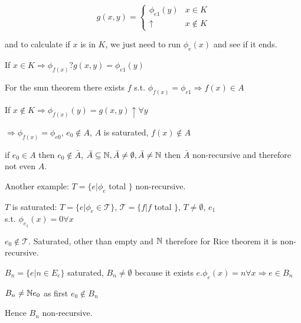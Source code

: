 \begin{equation*} g(x,y) = \begin{cases} \phi_{e1}(y) & x \in K \\
\uparrow & x \not\in K
  \end{cases}
\end{equation*}

and to calculate if $x$ is in $K$, we just need to run $ \phi_e(x) $
and see if it ends.

If $ x\in K \Rightarrow \phi_{f(x)} ? g(x,y) = \phi_{e1}(y)$

For the smn theorem there exists $f$ s.t. $ \phi_{f(x)} = \phi_{e1}
\Rightarrow f(x)\in A$

If $ x \not\in K \Rightarrow \phi_{f(x)}(y) = g(x,y) \uparrow \forall
y $

$ \Rightarrow \phi_{f(x)} = \phi_{e0} $, $ e_0 \not\in A $, $A$ is
saturated, $ f(x)\not\in A $

if $ e_0 \in A $ then $ e_0 \not \in \bar{A} $, $ \bar{A} \subseteq
\mathbb{N}, \bar{A} \not= \emptyset, \bar{A}\not=\mathbb{N} $ then $ \bar{A} $
non-recursive and therefore not even $A$.


Another example: $ T = \{e | \phi_e $ total $ \} $ non-recursive.

$T$ is saturated: $ T = \{e | \phi_e \in \mathcal{T} \} $, $
\mathcal{T} = \{f | f $ total $ \} $, $ T\not=\emptyset $, $ e_1 $\\
s.t. $ \phi_{e_1}(x) = 0 \forall x $

$ e_0 \not\in \mathcal{T} $. Saturated, other than empty and $ \mathbb{N} $
therefore for Rice theorem it is non-recursive.

$ B_n = \{e | n \in E_e \} $ saturated, $ B_n \not= \emptyset $
because it exists $ e. \phi_e(x) = n \forall x \Rightarrow e \in B_n $

$ B_n \not= \mathbb{N} e_0$ as first $ e_0 \not\in B_n $

Hence $ B_n $ non-recursive.